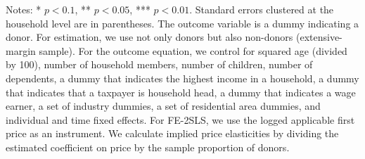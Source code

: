 \begin{table}
\begin{threeparttable}
\begin{tablenotes}
\item Notes: * $p < 0.1$, ** $p < 0.05$, *** $p < 0.01$. Standard errors clustered at the household level are in parentheses. The outcome variable is a dummy indicating a donor. For estimation, we use not only donors but also non-donors (extensive-margin sample). For the outcome equation, we control for squared age (divided by 100), number of household members, number of children, number of dependents, a dummy that indicates the highest income in a household, a dummy that indicates that a taxpayer is household head, a dummy that indicates a wage earner, a set of industry dummies, a set of residential area dummies, and individual and time fixed effects. For FE-2SLS, we use the logged applicable first price as an instrument. We calculate implied price elasticities by dividing the estimated coefficient on price by the sample proportion of donors.
\end{tablenotes}
\end{threeparttable}
\end{table}

